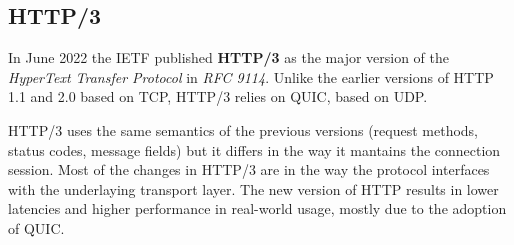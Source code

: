 		
		\subsection{HTTP/3}
			\par In June 2022 the IETF published \textbf{HTTP/3} as the major version of the \textit{HyperText Transfer Protocol} in \textit{RFC 9114}\cite{rfc9114}. Unlike the earlier versions of HTTP 1.1 and 2.0 based on TCP, HTTP/3 relies on QUIC, based on UDP. \newline
			\par HTTP/3 uses the same semantics of the previous versions (request methods, status codes, message fields) but it differs in the way it mantains the connection session. Most of the changes in HTTP/3 are in the way the protocol interfaces with the underlaying transport layer. The new version of HTTP results in lower latencies and higher performance in real-world usage, mostly due to the adoption of QUIC. 
